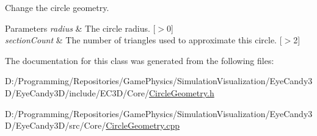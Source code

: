 Change the circle geometry. 


\begin{DoxyParams}{Parameters}
{\em radius} & The circle radius. \mbox{[}$>$0\mbox{]} \\
\hline
{\em section\+Count} & The number of triangles used to approximate this circle. \mbox{[}$>$2\mbox{]} \\
\hline
\end{DoxyParams}


The documentation for this class was generated from the following files\+:\begin{DoxyCompactItemize}
\item 
D\+:/\+Programming/\+Repositories/\+Game\+Physics/\+Simulation\+Visualization/\+Eye\+Candy3\+D/\+Eye\+Candy3\+D/include/\+E\+C3\+D/\+Core/\mbox{\hyperlink{_circle_geometry_8h}{Circle\+Geometry.\+h}}\item 
D\+:/\+Programming/\+Repositories/\+Game\+Physics/\+Simulation\+Visualization/\+Eye\+Candy3\+D/\+Eye\+Candy3\+D/src/\+Core/\mbox{\hyperlink{_circle_geometry_8cpp}{Circle\+Geometry.\+cpp}}\end{DoxyCompactItemize}
